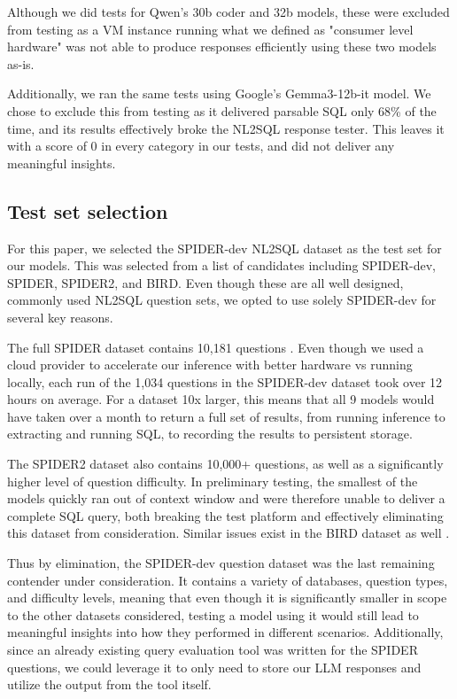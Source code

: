 \documentclass[sigconf]{acmart}
\begin{document}
Although we did tests for Qwen's 30b coder and 32b models, these were excluded from testing as a VM instance running 
what we defined as "consumer level hardware" was not able to produce responses efficiently using these two models as-is.

Additionally, we ran the same tests using Google's Gemma3-12b-it model. We chose to exclude this from testing as it
delivered parsable SQL only 68\% of the time, and its results effectively broke the NL2SQL response tester. This leaves
it with a score of 0 in every category in our tests, and did not deliver any meaningful insights.

\subsection*{Test set selection}

For this paper, we selected the SPIDER-dev \cite{Yu&al.18c} NL2SQL dataset as the test set for our models. This was 
selected from a list of candidates including SPIDER-dev, SPIDER, SPIDER2, and BIRD. Even though these are all well 
designed, commonly used NL2SQL question sets, we opted to use solely SPIDER-dev for several key reasons.

The full SPIDER dataset contains 10,181 questions \cite{yu2019spiderlargescalehumanlabeleddataset}. Even though we used
a cloud provider to accelerate our inference with better hardware vs running locally, each run of the 1,034 questions in
the SPIDER-dev dataset took over 12 hours on average. For a dataset 10x larger, this means that all 9 models would have 
taken over a month to return a full set of results, from running inference to extracting and running SQL, to recording
the results to persistent storage. 

The SPIDER2 dataset \cite{lei2025spider20evaluatinglanguage} also contains 10,000+ questions, as well as a significantly 
higher level of question difficulty. In preliminary testing, the smallest of the models quickly ran out of context
window and were therefore unable to deliver a complete SQL query, both breaking the test platform and effectively
eliminating this dataset from consideration. Similar issues exist in the BIRD dataset as well 
\cite{li2023llmservedatabaseinterface}.

Thus by elimination, the SPIDER-dev question dataset was the last remaining contender under consideration. It contains
a variety of databases, question types, and difficulty levels, meaning that even though it is significantly smaller in
scope to the other datasets considered, testing a model using it would still lead to meaningful insights into how
they performed in different scenarios. Additionally, since an already existing query evaluation tool was written for the 
SPIDER questions\cite{ruiqi20}, we could leverage it to only need to store our LLM responses and utilize the output from 
the tool itself.
\end{document}
